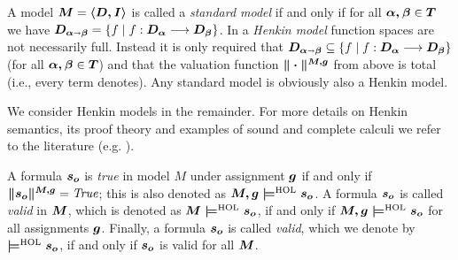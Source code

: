 \begin{definition}\label{homlhenkinmodel}
 A model $\boldsymbol{M}=\boldsymbol{\langle D, I \rangle}$ is called a
 \emph{standard model} if and only if for all $\boldsymbol{\alpha,\beta}\in \boldsymbol{T}$ we have
 $\boldsymbol{D_{\alpha\shortrightarrow\beta}} = \{ f \mid f : \boldsymbol{D_\alpha} \longrightarrow \boldsymbol{D_\beta}\}$. In a \emph{Henkin model} function spaces are not necessarily
 full. Instead it is only required that $\boldsymbol{D_{\alpha\shortrightarrow\beta}}
 \subseteq \{ f \mid f : \boldsymbol{D_\alpha} \longrightarrow \boldsymbol{D_\beta}\}$ (for all
 $\boldsymbol{\alpha,\beta}\in \boldsymbol{T}$) and that the valuation function 
 $\boldsymbol{\|\cdot\|^{M,g}}$ from above is total (i.e., every term denotes). Any standard model is obviously
 also a Henkin model. 
\end{definition}

We consider Henkin models in the remainder. For more details on Henkin
semantics, its proof theory and examples of sound and complete calculi
we refer to the literature (e.g. \cite{J6,J18}).

\begin{definition}[Validity]\label{homlvalid}
A formula $\boldsymbol{s_o}$ is \emph{true} in model $M$ 
under assignment $\boldsymbol{g}$ if and only if $\boldsymbol{\|s_o\|^{M,g}} = {\mathit{True}}$; this is also denoted
as $\boldsymbol{M,g \models^{\text{\textrm{HOL}}} s_o}$.  A formula $\boldsymbol{s_o}$ is called \emph{valid} in
$\boldsymbol{M}$, which is denoted as $\boldsymbol{M \models^{\text{\textrm{HOL}}} s_o}$, if and only if $\boldsymbol{M,g \models^{\text{\textrm{HOL}}} s_o}$ for all
assignments $\boldsymbol{g}$. Finally, a formula $\boldsymbol{s_o}$ is called
\emph{valid}, which we denote by $\boldsymbol{\models^{\text{\textrm{HOL}}} s_o}$, if and only if $\boldsymbol{s_o}$ is valid for
all $\boldsymbol{M}$. 
\end{definition}











